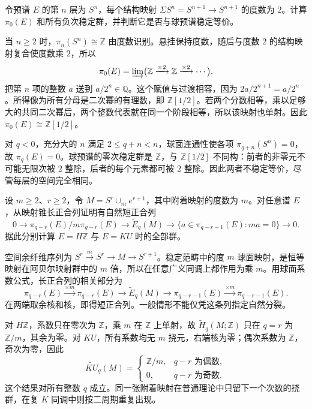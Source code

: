 \begin{exercise}\label{g2:ex:spectrum-degree-two-system}
	令预谱 \(E\) 的第 \(n\) 层为 \(S^n\)，每个结构映射 \(\Sigma S^n=S^{n+1}\to S^{n+1}\) 的度数为 \(2\)。计算 \(\pi_0(E)\) 和所有负次稳定群，并判断它是否与球预谱稳定等价。
\end{exercise}
\begin{solution}
	当 \(n\ge2\) 时，\(\pi_n(S^n)\cong\mathbb Z\) 由度数识别。悬挂保持度数，随后与度数 \(2\) 的结构映射复合使度数乘 \(2\)，所以
	\[
		\pi_0(E)=\varinjlim\bigl(\mathbb Z\xrightarrow{\times2}\mathbb Z\xrightarrow{\times2}\cdots\bigr).
	\]
	把第 \(n\) 项的整数 \(a\) 送到 \(a/2^n\in\mathbb Q\)。这个赋值与过渡相容，因为 \(2a/2^{n+1}=a/2^n\)。所得像为所有分母是二次幂的有理数，即 \(\mathbb Z[1/2]\)。若两个分数相等，乘以足够大的共同二次幂后，两个整数代表就在同一个阶段相等，所以该映射也单射。因此 \(\pi_0(E)\cong\mathbb Z[1/2]\)。

	对 \(q<0\)，充分大的 \(n\) 满足 \(2\le q+n<n\)，球面连通性使各项 \(\pi_{q+n}(S^n)=0\)，故 \(\pi_q(E)=0\)。球预谱的零次稳定群是 \(\mathbb Z\)，与 \(\mathbb Z[1/2]\) 不同构：前者的非零元不可能无限次被 \(2\) 整除，后者的每个元素都可被 \(2\) 整除。因此两者不稳定等价，尽管每层的空间完全相同。
\end{solution}

\begin{exercise}\label{g2:ex:generalized-moore-homology}
	设 \(m\ge2\)、\(r\ge2\)，令 \(M=S^r\cup_m e^{r+1}\)，其中附着映射的度数为 \(m\)。对任意谱 \(E\)，从映射锥长正合列证明有自然短正合列
	\[
		0\longrightarrow\pi_{q-r}(E)/m\pi_{q-r}(E)
		\longrightarrow\widetilde E_q(M)
		\longrightarrow\{a\in\pi_{q-r-1}(E):ma=0\}\longrightarrow0.
	\]
	据此分别计算 \(E=H\mathbb Z\) 与 \(E=KU\) 时的全部群。
\end{exercise}
\begin{solution}
	空间余纤维序列为 \(S^r\xrightarrow{m}S^r\to M\to S^{r+1}\)。稳定范畴中的度 \(m\) 球面映射，是恒等映射在阿贝尔映射群中的 \(m\) 倍，所以在任意广义同调上都作用为乘 \(m\)。用球面系数公式，长正合列的相关部分为
	\[
		\pi_{q-r}(E)\xrightarrow{\times m}\pi_{q-r}(E)
		\longrightarrow\widetilde E_q(M)\longrightarrow
		\pi_{q-r-1}(E)\xrightarrow{\times m}\pi_{q-r-1}(E).
	\]
	在两端取余核和核，即得短正合列。一般情形不能仅凭这条列指定自然分裂。

	对 \(H\mathbb Z\)，系数只在零次为 \(\mathbb Z\)，乘 \(m\) 在 \(\mathbb Z\) 上单射，故 \(\widetilde H_q(M;\mathbb Z)\) 只在 \(q=r\) 为 \(\mathbb Z/m\)，其余为零。对 \(KU\)，所有系数均无 \(m\) 挠元，右端核为零；偶次系数为 \(\mathbb Z\)，奇次为零，因此
	\[
		\widetilde{KU}_q(M)=
		\begin{cases}\mathbb Z/m,&q-r\text{ 为偶数},\\0,&q-r\text{ 为奇数}.
		\end{cases}
	\]
	这个结果对所有整数 \(q\) 成立。同一张附着映射在普通理论中只留下一个次数的挠群，在复 \(K\) 同调中则按二周期重复出现。
\end{solution}

